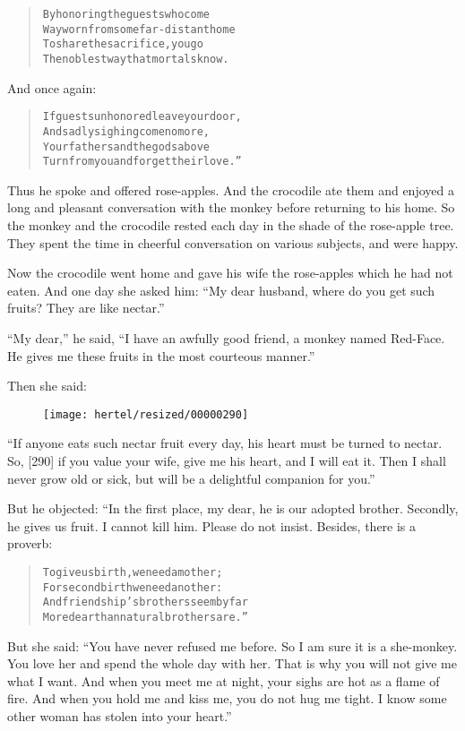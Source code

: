 \documentclass[article, twoside, 10pt]{memoir}
\renewenvironment{verbatim}{%
\begin{quote}%
\vskip -10pt%
\begin{alltt}\normalfont\small}{\end{alltt}%
\end{quote}%
\vskip -10pt
} %
\begin{document}
\begin{verbatim}
By honoring the guests who come
Wayworn from some far-distant home
To share the sacrifice, you go
The noblest way that mortals know.
\end{verbatim}
And once again:

\begin{verbatim}
If guests unhonored leave your door,
And sadly sighing come no more,
Your fathers and the gods above
Turn from you and forget their love.”
\end{verbatim}
Thus he spoke and offered rose-apples. And the crocodile ate them
and enjoyed a long and pleasant conversation with the monkey before
returning to his home. So the monkey and the crocodile rested each
day in the shade of the rose-apple tree. They spent the time in
cheerful conversation on various subjects, and were happy.

Now the crocodile went home and gave his wife the rose-apples which
he had not eaten. And one day she asked him:
``My dear husband, where do you get such fruits? They are like nectar.''

``My dear,'' he said,
``I have an awfully good friend, a monkey named Red-Face. He gives me these fruits in the most courteous manner.''

Then she said:
\begin{figure}[p]\texttt{[image: hertel/resized/00000290]}\end{figure}``If anyone eats such nectar fruit every day, his heart must be turned to nectar. So, [290] if you value your wife, give me his heart, and I will eat it. Then I shall never grow old or sick, but will be a delightful companion for you.''

But he objected: “In the first place, my dear, he is our adopted
brother. Secondly, he gives us fruit. I cannot kill him. Please do
not insist. Besides, there is a proverb:

\begin{verbatim}
To give us birth, we need a mother;
For second birth we need another:
And friendship's brothers seem by far
More dear than natural brothers are.”
\end{verbatim}
But she said:
``You have never refused me before. So I am sure it is a she-monkey. You love her and spend the whole day with her. That is why you will not give me what I want. And when you meet me at night, your sighs are hot as a flame of fire. And when you hold me and kiss me, you do not hug me tight. I know some other woman has stolen into your heart.''
\end{document}
